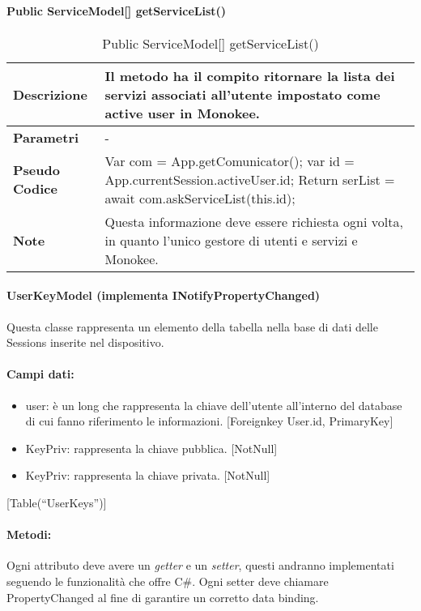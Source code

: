 \paragraph{Public ServiceModel[] getServiceList()}
\begin{center}
    \begin{longtable}{|p{3cm}|p{9cm}|}%
    \caption{Public ServiceModel[] getServiceList()}
    \endfirsthead
    \endhead
    \hline
    \textbf{Descrizione} & Il metodo ha il compito ritornare la lista dei servizi associati all’utente impostato come active user in Monokee.\\
    \hline
    \textbf{Parametri} &      
    -
    \\
    \hline
    \textbf{Pseudo Codice} & 
    Var com = App.getComunicator();\newline
    var id = App.currentSession.activeUser.id;\newline
    Return serList = await com.askServiceList(this.id);\newline
    \\
    \hline
    \textbf{Note} & 
    Questa informazione deve essere richiesta ogni volta, in quanto l’unico gestore di utenti e servizi e Monokee.
    \\
    \hline
    \end{longtable}
    \end{center}


\paragraph{UserKeyModel (implementa INotifyPropertyChanged)}
Questa classe rappresenta un elemento della tabella nella base di dati delle Sessions inserite nel dispositivo.
\paragraph{Campi dati:}
\begin{itemize}
    \item user: è un long che rappresenta la chiave dell’utente all’interno del database di cui fanno riferimento le informazioni. [Foreignkey User.id, PrimaryKey]
    \item KeyPriv: rappresenta la chiave pubblica. [NotNull]
    \item KeyPriv: rappresenta la chiave privata. [NotNull]
\end{itemize}
[Table(“UserKeys”)]\\
\paragraph{Metodi:}
Ogni attributo deve avere un \emph{getter} e un \emph{setter}, questi andranno implementati seguendo le funzionalità che offre C\#. Ogni setter deve chiamare PropertyChanged al fine di garantire un corretto data binding.


